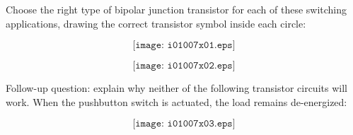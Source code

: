 

Choose the right type of bipolar junction transistor for each of these switching applications, drawing the correct transistor symbol inside each circle:

$$\texttt{[image: i01007x01.eps]}$$







$$\texttt{[image: i01007x02.eps]}$$

\vskip 10pt

Follow-up question: explain why neither of the following transistor circuits will work.  When the pushbutton switch is actuated, the load remains de-energized:

$$\texttt{[image: i01007x03.eps]}$$












